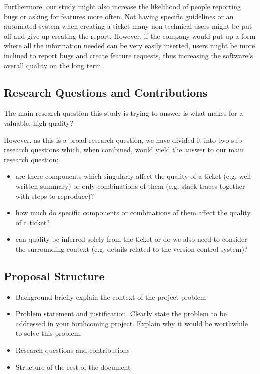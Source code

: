 \documentclass{mprop}
\begin{document}
Furthermore, our study might also increase the likelihood of people
reporting bugs or asking for features more often. Not having specific 
guidelines or an automated system when creating a ticket many 
non-technical users might be put off and give up creating the report. 
However, if the company would put up a form where all the information
needed can be very easily inserted, users might be more inclined 
to report bugs and create feature requests, thus increasing the 
software's overall quality on the long term.

\subsection{Research Questions and Contributions}

The main research question this study is trying to answer is 
what makes for a valuable, high quality?

However, as this is a broad research question, we have divided it into
two sub-research questions which, when combined, would yield the 
answer to our main research question:
  \begin{itemize}
    \item are there components which singularly affect the quality
      of a ticket (e.g. well written summary) or only combinations of them 
      (e.g. stack traces together with steps to reproduce)?
    \item how much do specific components or combinations of them 
      affect the quality of a ticket?
    \item can quality be inferred solely from the ticket or do we also
      need to consider the surrounding context (e.g. details related to
      the version control system)?
  \end{itemize}

\subsection{Proposal Structure}

\begin{itemize}
\item Background briefly explain the context of the project problem
\item Problem statement and justification. Clearly state the problem to be addressed in your forthcoming project.
  Explain why it would be worthwhile to solve this problem.

\item Research questions and contributions
\item Structure of the rest of the document
\end{itemize}
\end{document}
